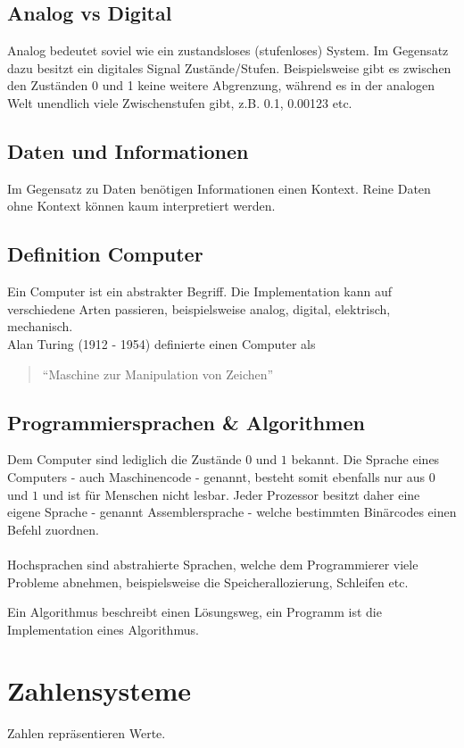 \documentclass[a4paper,10pt]{report}
\begin{document}
\section{Analog vs Digital}
Analog bedeutet soviel wie ein zustandsloses (stufenloses) System. Im Gegensatz dazu besitzt ein digitales Signal Zustände/Stufen.
Beispielsweise gibt es zwischen den Zuständen 0 und 1 keine weitere Abgrenzung, während es in der analogen Welt unendlich viele Zwischenstufen gibt, z.B. 0.1, 0.00123 etc.
\section{Daten und Informationen}
Im Gegensatz zu Daten benötigen Informationen einen Kontext. Reine Daten ohne Kontext können kaum interpretiert werden.
\section{Definition Computer}
Ein Computer ist ein abstrakter Begriff. Die Implementation kann auf verschiedene Arten passieren, beispielsweise analog, digital, elektrisch, mechanisch. \\
Alan Turing (1912 - 1954) definierte einen Computer als \begin{quote}"`Maschine zur Manipulation von Zeichen"'\end{quote}
\section{Programmiersprachen \& Algorithmen}
Dem Computer sind lediglich die Zustände $0$ und $1$ bekannt. Die Sprache eines Computers - auch Maschinencode - genannt, besteht somit ebenfalls nur aus $0$ und $1$ und ist für Menschen nicht lesbar. Jeder Prozessor besitzt daher eine eigene Sprache - genannt Assemblersprache - welche bestimmten Binärcodes einen Befehl zuordnen.
\\ \\ Hochsprachen sind abstrahierte Sprachen, welche dem Programmierer viele Probleme abnehmen, beispielsweise die Speicherallozierung, Schleifen etc. 

Ein Algorithmus beschreibt einen Lösungsweg, ein Programm ist die Implementation eines Algorithmus.
\chapter{Zahlensysteme}
Zahlen repräsentieren Werte.
\end{document}
